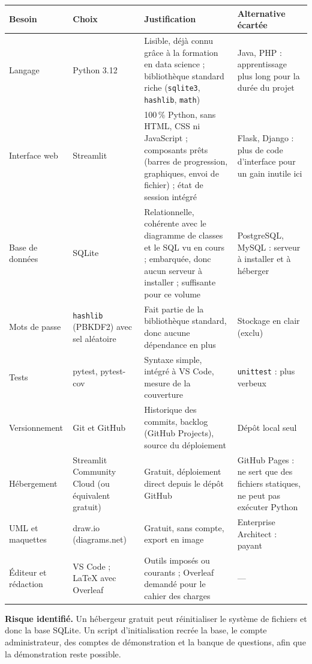 \documentclass[11pt,a4paper]{article}
\begin{document}
\begin{center}
\small
\begin{longtable}{L{2.3cm}L{2.6cm}L{6.1cm}L{3.4cm}}
\toprule
\textbf{Besoin} & \textbf{Choix} & \textbf{Justification} & \textbf{Alternative \'ecart\'ee}\\
\midrule
\endhead
Langage & Python 3.12 & Lisible, d\'ej\`a connu gr\^ace \`a la formation en data science ; biblioth\`eque standard riche (\texttt{sqlite3}, \texttt{hashlib}, \texttt{math}) & Java, PHP : apprentissage plus long pour la dur\'ee du projet\\
\addlinespace
Interface web & Streamlit & 100\,\% Python, sans HTML, CSS ni JavaScript ; composants pr\^ets (barres de progression, graphiques, envoi de fichier) ; \'etat de session int\'egr\'e & Flask, Django : plus de code d'interface pour un gain inutile ici\\
\addlinespace
Base de donn\'ees & SQLite & Relationnelle, coh\'erente avec le diagramme de classes et le SQL vu en cours ; embarqu\'ee, donc aucun serveur \`a installer ; suffisante pour ce volume & PostgreSQL, MySQL : serveur \`a installer et \`a h\'eberger\\
\addlinespace
Mots de passe & \texttt{hashlib} (PBKDF2) avec sel al\'eatoire & Fait partie de la biblioth\`eque standard, donc aucune d\'ependance en plus & Stockage en clair (exclu)\\
\addlinespace
Tests & pytest, pytest-cov & Syntaxe simple, int\'egr\'e \`a VS Code, mesure de la couverture & \texttt{unittest} : plus verbeux\\
\addlinespace
Versionnement & Git et GitHub & Historique des commits, backlog (GitHub Projects), source du d\'eploiement & D\'epôt local seul\\
\addlinespace
H\'ebergement & Streamlit Community Cloud (ou \'equivalent gratuit) & Gratuit, d\'eploiement direct depuis le d\'ep\^ot GitHub & GitHub Pages : ne sert que des fichiers statiques, ne peut pas ex\'ecuter Python\\
\addlinespace
UML et maquettes & draw.io (diagrams.net) & Gratuit, sans compte, export en image & Enterprise Architect : payant\\
\addlinespace
\'Editeur et r\'edaction & VS Code ; LaTeX avec Overleaf & Outils impos\'es ou courants ; Overleaf demand\'e pour le cahier des charges & ---\\
\bottomrule
\end{longtable}
\end{center}

\textbf{Risque identifi\'e.} Un h\'ebergeur gratuit peut r\'einitialiser le syst\`eme de fichiers et donc la base SQLite. Un script d'initialisation recr\'ee la base, le compte administrateur, des comptes de d\'emonstration et la banque de questions, afin que la d\'emonstration reste possible.
\end{document}
